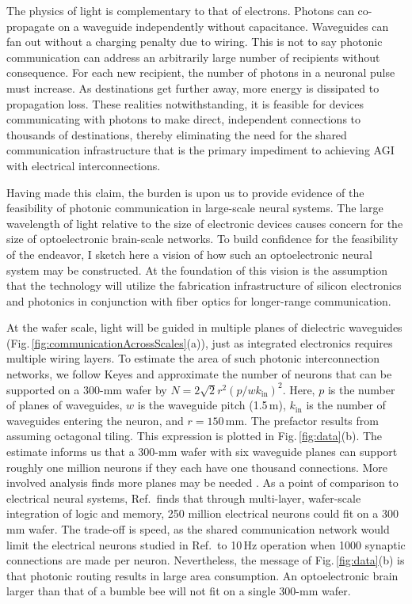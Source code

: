 \documentclass[twocolumn]{article}
\newcommand{\onlinecite}[1]{\hspace{-1 ex} \nocite{#1}\citenum{#1}}
\begin{document}
The physics of light is complementary to that of electrons. Photons can co-propagate on a waveguide independently without capacitance. Waveguides can fan out without a charging penalty due to wiring. This is not to say photonic communication can address an arbitrarily large number of recipients without consequence. For each new recipient, the number of photons in a neuronal pulse must increase. As destinations get further away, more energy is dissipated to propagation loss. These realities notwithstanding, it is feasible for devices communicating with photons to make direct, independent connections to thousands of destinations, thereby eliminating the need for the shared communication infrastructure that is the primary impediment to achieving AGI with electrical interconnections.

Having made this claim, the burden is upon us to provide evidence of the feasibility of photonic communication in large-scale neural systems. The large wavelength of light relative to the size of electronic devices causes concern for the size of optoelectronic brain-scale networks. To build confidence for the feasibility of the endeavor, I sketch here a vision of how such an optoelectronic neural system may be constructed. At the foundation of this vision is the assumption that the technology will utilize the fabrication infrastructure of silicon electronics and photonics in conjunction with fiber optics for longer-range communication. 

At the wafer scale, light will be guided in multiple planes of dielectric waveguides \cite{chbu2017,chbu2018} (Fig.\,\ref{fig:communicationAcrossScales}(a)), just as integrated electronics requires multiple wiring layers. To estimate the area of such photonic interconnection networks, we follow Keyes \cite{ke1982} and approximate the number of neurons that can be supported on a 300-mm wafer by $N = 2\sqrt{2}r^2\left(p/wk_{\mathrm{in}}\right)^2$. Here, $p$ is the number of planes of waveguides, $w$ is the waveguide pitch (1.5\,\textmu m), $k_{\mathrm{in}}$ is the number of waveguides entering the neuron, and $r = 150$\,mm. The prefactor results from assuming octagonal tiling. This expression is plotted in Fig.\,\ref{fig:data}(b). The estimate informs us that a 300-mm wafer with six waveguide planes can support roughly one million neurons if they each have one thousand connections. More involved analysis finds more planes may be needed \cite{sh2018_ICRC}. As a point of comparison to electrical neural systems, Ref.\,\onlinecite{kuwa2017} finds that through multi-layer, wafer-scale integration of logic and memory, 250 million electrical neurons could fit on a 300\,mm wafer. The trade-off is speed, as the shared communication network would limit the electrical neurons studied in Ref.\,\onlinecite{kuwa2017} to 10\,Hz operation when 1000 synaptic connections are made per neuron. Nevertheless, the message of Fig.\,\ref{fig:data}(b) is that photonic routing results in large area consumption. An optoelectronic brain larger than that of a bumble bee will not fit on a single 300-mm wafer.
\end{document}
